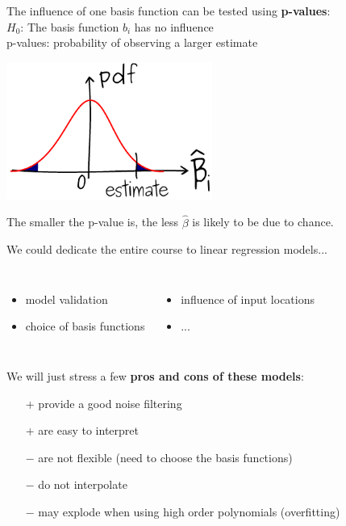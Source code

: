 \documentclass{beamer}
\begin{document}
\begin{frame}{}
The influence of one basis function can be tested using \textbf{p-values}:\\
\qquad $H_0$: The basis function $b_i$ has no influence\\
\qquad p-values: probability of observing a larger estimate
\begin{center}
  \includegraphics[height=4.5cm]{figures/ink_pvalue}
\end{center}
The smaller the p-value is, the less $\hat{\beta}$ is likely to be due to chance.
\end{frame}

\begin{frame}{}
We could dedicate the entire course to linear regression models...
\begin{columns}[c]
\column{5cm}
\begin{itemize}
	\item model validation
	\item choice of basis functions
\end{itemize}
\column{6cm}
\begin{itemize}
	\item influence of input locations
	\item ...
\end{itemize}
\end{columns}
\vspace{10mm}
We will just stress a few \textbf{pros and cons of these models}:
\begin{itemize}
  \item[+] provide a good noise filtering
  \item[+] are easy to interpret
  \item[] \vspace{-5mm}
  \item[$-$] are not flexible (need to choose the basis functions)
  \item[$-$] do not interpolate
  \item[$-$] may explode when using high order polynomials (overfitting)
\end{itemize}
\end{frame}
\end{document}
